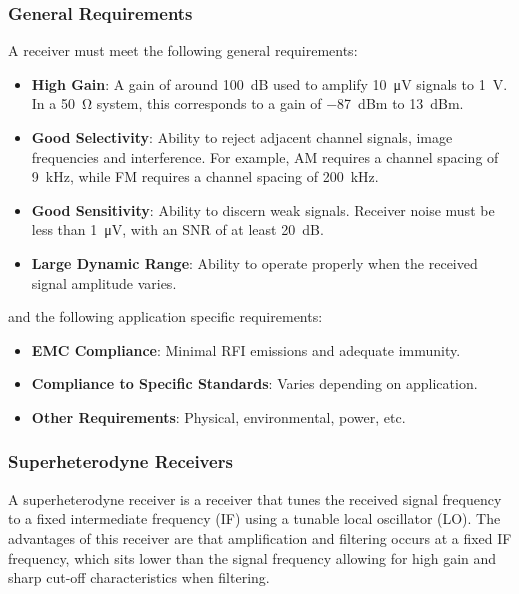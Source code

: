 \documentclass{article}
\begin{document}
\subsubsection{General Requirements}
A receiver must meet the following general requirements:
\begin{itemize}
    \item \textbf{High Gain}: A gain of around \qty{100}{dB} used to amplify \qty{10}{\micro V} signals to \qty{1}{V}.
          In a \qty{50}{\ohm} system, this corresponds to a gain of \qty{-87}{dBm} to \qty{13}{dBm}.
    \item \textbf{Good Selectivity}: Ability to reject adjacent channel signals, image frequencies and interference.
          For example, AM requires a channel spacing of \qty{9}{kHz}, while FM requires a channel spacing of \qty{200}{kHz}.
    \item \textbf{Good Sensitivity}: Ability to discern weak signals. Receiver noise must be less than \qty{1}{\micro V}, with an SNR of at least \qty{20}{dB}.
    \item \textbf{Large Dynamic Range}: Ability to operate properly when the received signal amplitude varies.
\end{itemize}
and the following application specific requirements:
\begin{itemize}
    \item \textbf{EMC Compliance}: Minimal RFI emissions and adequate immunity.
    \item \textbf{Compliance to Specific Standards}: Varies depending on application.
    \item \textbf{Other Requirements}: Physical, environmental, power, etc.
\end{itemize}
\subsubsection{Superheterodyne Receivers}
A superheterodyne receiver is a receiver that tunes the received signal
frequency to a fixed intermediate frequency (IF) using a tunable local
oscillator (LO). The advantages of this receiver are that amplification
and filtering occurs at a fixed IF frequency, which sits lower than the
signal frequency allowing for high gain and sharp cut-off
characteristics when filtering.
\end{document}
